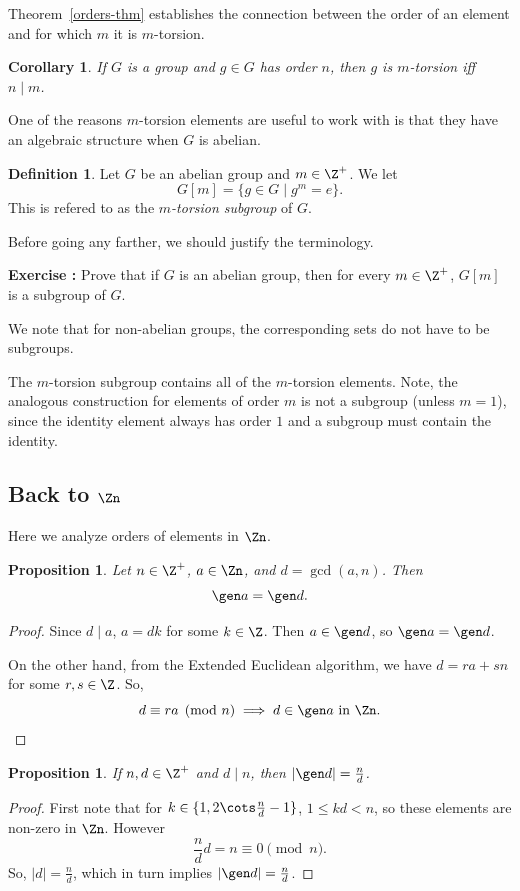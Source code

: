 \documentclass[12pt]{amsart}
\newcounter{probs}
\newenvironment{prob}{%
  \refstepcounter{probs}
  \par\medskip\noindent\textbf{Exercise \theprobs:} }{\par\medskip}
\theoremstyle{plain}
\newtheorem{prop}[thm]{Proposition}
\newtheorem{cor}[thm]{Corollary}
\theoremstyle{definition}
\newtheorem{defn}[thm]{Definition}
\theoremstyle{remark}
\begin{document}
Theorem~\ref{orders-thm} establishes the connection between the
order of an element and for which $m$ it is $m$-torsion.
\begin{cor}
  If $G$ is a group and $g\in G$ has order $n$, then $g$ is
  $m$-torsion iff $n \mid m$.
\end{cor}
One of the reasons $m$-torsion elements are useful to work with is
that they have an algebraic structure when $G$ is abelian.
\begin{defn}
  Let $G$ be an abelian group and $m\in\Z^+$.  We let
  \[ G[m] = \{g\in G\mid g^m=e\}.\]
  This is refered to as the \emph{$m$-torsion subgroup} of $G$.
\end{defn}
Before going any farther, we should justify the terminology.
\begin{prob}
  Prove that if $G$ is an abelian group, then for every $m\in\Z^+$,
  $G[m]$ is a subgroup of $G$.
\end{prob}
We note that for non-abelian groups, the corresponding sets do not
have to be subgroups.

The $m$-torsion subgroup contains all of the $m$-torsion elements.
Note, the analogous construction for elements of order $m$ is not a
subgroup (unless $m=1$), since the identity element always has order
$1$ and a subgroup must contain the identity.


\subsection{Back to $\Zn$}\label{zn2}
Here we analyze orders of elements in $\Zn$.
\begin{prop} \label{imageszn}
  Let $n\in\Z^+$, $a\in \Zn$, and $d=\gcd(a,n)$.  Then
  \[ \gen a = \gen d.\]
\end{prop}
\begin{proof}
  Since $d\mid a$, $a=dk$ for some $k\in \Z$.  Then $a\in \gen d$, so
  $\gen a = \gen d$.

  On the other hand, from the Extended Euclidean algorithm, we have
  $d=ra+sn$ for some $r,s\in\Z$.  So, 
  \[ d\equiv ra\pmod n \implies d\in \gen a \text{ in $\Zn$.}\]
\end{proof}  
\begin{prop}
  If $n,d\in\Z^+$ and $d\mid n$, then $|\gen d|=\frac n d$.
\end{prop}
\begin{proof}
  First note that for $k\in \{1,2\cots \frac n d -1\}$, $1\leq kd <
  n$, so these elements are non-zero in $\Zn$.  However 
 \[ \frac n d d = n \equiv 0\pmod n.\]
  So, $|d|=\frac n d$, which in turn implies $|\gen d|=\frac n d$.
\end{proof}
\end{document}
